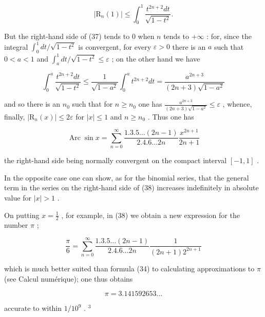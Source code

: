 \[
| \mathrm{R} _ {n} (1) | \leqslant \int_ {0} ^ {1} \frac {t ^ {2 n + 2} d t}{\sqrt {1 - t ^ {2}}}.\tag{37}
\]

But the right-hand side of (37) tends to 0 when \(n\) tends to \(+\infty\) : for, since the integral \(\int_0^1 dt / \sqrt{1 - t^2}\) is convergent, for every \(\varepsilon > 0\) there is an \(a\) such that \(0 < a < 1\) and \(\int_a^1 dt / \sqrt{1 - t^2} \leqslant \varepsilon\) ; on the other hand we have

\[
\int_ {0} ^ {a} \frac {t ^ {2 n + 2} d t}{\sqrt {1 - t ^ {2}}} \leqslant \frac {1}{\sqrt {1 - a ^ {2}}} \int_ {0} ^ {a} t ^ {2 n + 2} d t = \frac {a ^ {2 n + 3}}{(2 n + 3) \sqrt {1 - a ^ {2}}}
\]

and so there is an \(n_0\) such that for \(n \geqslant n_0\) one has \(\frac{a^{2n+3}}{(2n+3)\sqrt{1-a^2}} \leqslant \varepsilon\) , whence, finally, \(|\mathrm{R}_n(x)| \leqslant 2\varepsilon\) for \(|x| \leqslant 1\) and \(n \geqslant n_0\) . Thus one has

\[
\operatorname{Arc} \sin x = \sum_ {n = 0} ^ {\infty} \frac {1 . 3 . 5 \dots (2 n - 1)}{2 . 4 . 6 \dots 2 n} \frac {x ^ {2 n + 1}}{2 n + 1}\tag{38}
\]

the right-hand side being normally convergent on the compact interval \([-1, 1]\) .

In the opposite case one can show, as for the binomial series, that the general term in the series on the right-hand side of (38) increases indefinitely in absolute value for \(|x| > 1\) .

On putting \(x = \frac{1}{2}\) , for example, in (38) we obtain a new expression for the number \(\pi\) ;

\[
\frac {\pi}{6} = \sum_ {n = 0} ^ {\infty} \frac {1 . 3 . 5 \dots (2 n - 1)}{2 . 4 . 6 \dots 2 n} \frac {1}{(2 n + 1) 2 ^ {2 n + 1}}
\]

which is much better suited than formula (34) to calculating approximations to \(\pi\) (see Calcul numérique); one thus obtains

\[
\pi = 3. 1 4 1   5 9 2   6 5 3 \dots
\]

accurate to within \(1/10^{9}\) . \(^{3}\)
\relax{}
\setcounter{exercisegroup}{0}
